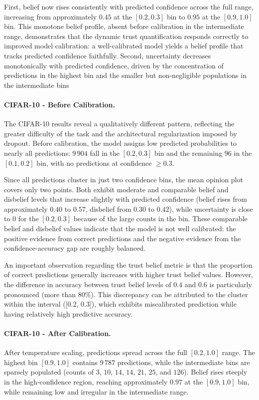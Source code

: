 First, belief now rises consistently with predicted confidence across the full range, increasing from approximately $0.45$ at the $[0.2, 0.3]$ bin to $0.95$ at the $[0.9, 1.0]$ bin. This monotone belief profile, absent before calibration in the intermediate range, demonstrates that the dynamic trust quantification responds correctly to improved model calibration: a well-calibrated model yields a belief profile that tracks predicted confidence faithfully. Second, uncertainty decreases monotonically with predicted confidence, driven by the concentration of predictions in the highest bin and the smaller but non-negligible populations in the intermediate bins

\paragraph{CIFAR-10 - Before Calibration.}
The CIFAR-10 results reveal a qualitatively different pattern, reflecting the greater difficulty of the task and the architectural regularization imposed by dropout. Before calibration, the model assigns low predicted probabilities to nearly all predictions: $9\,904$ fall in the $[0.2, 0.3]$ bin and the remaining $96$ in the $[0.1, 0.2]$ bin, with no predictions at confidence $\geq 0.3$. 

Since all predictions cluster in just two confidence bins, the mean opinion plot covers only two points. Both exhibit moderate and comparable belief and disbelief levels that increase slightly with predicted confidence (belief rises from approximately $0.40$ to $0.57$, disbelief from $0.30$ to $0.42$), while uncertainty is close to 0 for the $[0.2, 0.3]$ because of the large counts in the bin. These comparable belief and disbelief values indicate that the model is not well calibrated: the positive evidence from correct predictions and the negative evidence from the confidence-accuracy gap are roughly balanced.

An important observation regarding the trust belief metric is that the proportion of correct predictions generally increases with higher trust belief values. However, the difference in accuracy between trust belief levels of $0.4$ and $0.6$ is particularly pronounced (more than \(80\%\)). This discrepancy can be attributed to the cluster within the interval ([0.2, 0.3]), which exhibits miscalibrated prediction while having relatively high predictive accuracy.


\paragraph{CIFAR-10 - After Calibration.}
After temperature scaling, predictions spread across the full $[0.2,1.0]$ range. The highest bin $[0.9, 1.0]$ contains $9\,787$ predictions, while the intermediate bins are sparsely populated (counts of $3$, $10$, $14$, $14$, $21$, $25$, and $126$). Belief rises steeply in the high-confidence region, reaching approximately $0.97$ at the $[0.9, 1.0]$ bin, while remaining low and irregular in the intermediate range.

